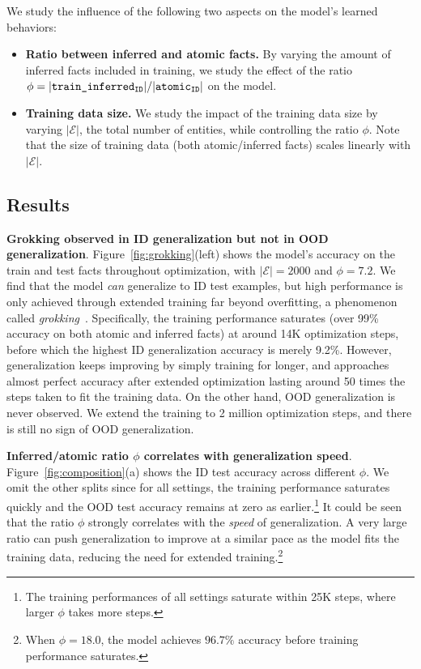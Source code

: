 We study the influence of the following two aspects on the model's learned behaviors:   
\begin{itemize}[noitemsep,nolistsep,leftmargin=*]
    \item \textbf{Ratio between inferred and atomic facts.} By varying the amount of inferred facts included in training, we study the effect of the ratio $\phi=|\text{\texttt{\textmd {train\_inferred$_{\text{ID}}$}}}|/|\text{\texttt{\textmd {atomic$_{\text{ID}}$}}}|$ on the model.
    \item \textbf{Training data size.} We study the impact of the training data size by varying $|\mathcal{E}|$, the total number of entities, while controlling the ratio $\phi$. Note that the size of training data (both atomic/inferred facts) scales linearly with $|\mathcal{E}|$.
\end{itemize}

\subsection{Results}

\noindent\textbf{Grokking observed in ID generalization but not in OOD generalization}. Figure~\ref{fig:grokking}(left) shows the model's accuracy on the train and test facts throughout optimization, with $|\mathcal{E}|=2000$ and $\phi=7.2$. We find that the model \textit{can} generalize to ID test examples, but high performance is only achieved through extended training far beyond overfitting, a phenomenon called \textit{grokking}~\citep{power2022grokking}. Specifically, the training performance saturates (over \num{99}\% accuracy on both atomic and inferred facts) at around 14K optimization steps, before which the highest ID generalization accuracy is merely \num{9.2}\%. However, generalization keeps improving by simply training for longer, and approaches almost perfect accuracy after extended optimization lasting around \num{50} times the steps taken to fit the training data. On the other hand, OOD generalization is never observed. We extend the training to \num{2} million optimization steps, and there is still no sign of OOD generalization.

\noindent\textbf{Inferred/atomic ratio $\phi$ correlates with generalization speed}. Figure~\ref{fig:composition}(a) shows the ID test accuracy across different $\phi$. We omit the other splits since for all settings, the training performance saturates quickly and the OOD test accuracy remains at zero as earlier.\footnote{The training performances of all settings saturate within \num{25}K steps, where larger $\phi$ takes more steps.} It could be seen that the ratio $\phi$ strongly correlates with the \textit{speed} of generalization. A very large ratio can push generalization to improve at a similar pace as the model fits the training data, reducing the need for extended training.\footnote{When $\phi=18.0$, the model achieves $96.7\%$ accuracy before training performance saturates.} 

